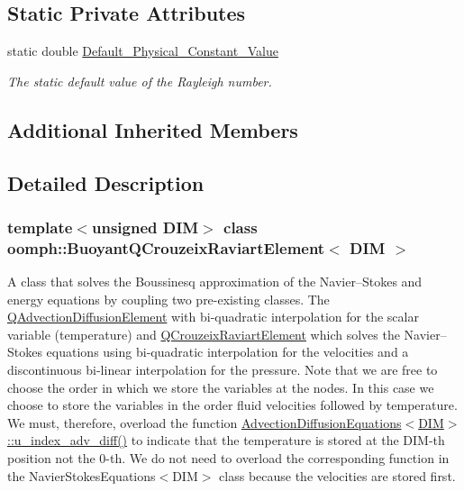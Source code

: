 \subsection*{Static Private Attributes}
\begin{DoxyCompactItemize}
\item 
static double \hyperlink{classoomph_1_1BuoyantQCrouzeixRaviartElement_a3214e603f9b4108348c6a9abcede67ac}{Default\+\_\+\+Physical\+\_\+\+Constant\+\_\+\+Value}
\begin{DoxyCompactList}\small\item\em The static default value of the Rayleigh number. \end{DoxyCompactList}\end{DoxyCompactItemize}
\subsection*{Additional Inherited Members}


\subsection{Detailed Description}
\subsubsection*{template$<$unsigned D\+IM$>$\newline
class oomph\+::\+Buoyant\+Q\+Crouzeix\+Raviart\+Element$<$ D\+I\+M $>$}

A class that solves the Boussinesq approximation of the Navier--Stokes and energy equations by coupling two pre-\/existing classes. The \hyperlink{classoomph_1_1QAdvectionDiffusionElement}{Q\+Advection\+Diffusion\+Element} with bi-\/quadratic interpolation for the scalar variable (temperature) and \hyperlink{classoomph_1_1QCrouzeixRaviartElement}{Q\+Crouzeix\+Raviart\+Element} which solves the Navier--Stokes equations using bi-\/quadratic interpolation for the velocities and a discontinuous bi-\/linear interpolation for the pressure. Note that we are free to choose the order in which we store the variables at the nodes. In this case we choose to store the variables in the order fluid velocities followed by temperature. We must, therefore, overload the function \hyperlink{classoomph_1_1AdvectionDiffusionEquations_aadffa26c42be5d4a1156a7467de48fb8}{Advection\+Diffusion\+Equations$<$\+D\+I\+M$>$\+::u\+\_\+index\+\_\+adv\+\_\+diff()} to indicate that the temperature is stored at the D\+I\+M-\/th position not the 0-\/th. We do not need to overload the corresponding function in the Navier\+Stokes\+Equations$<$\+D\+I\+M$>$ class because the velocities are stored first. 

